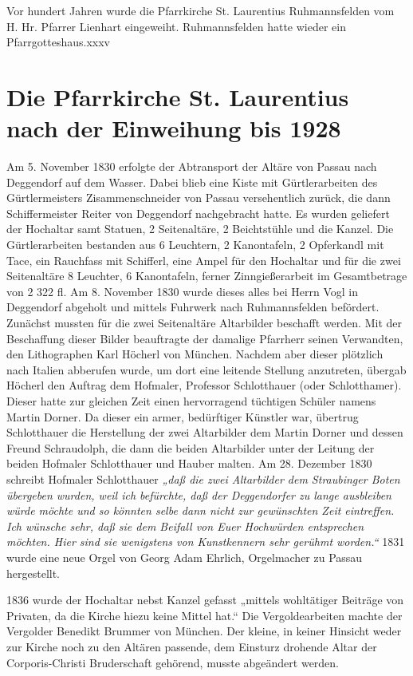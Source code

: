 \documentclass[12pt,a4paper]{book}
\begin{document}
Vor hundert Jahren wurde die Pfarrkirche St. Laurentius Ruhmannsfelden vom H.
Hr. Pfarrer Lienhart eingeweiht. Ruhmannsfelden hatte wieder ein
Pfarrgotteshaus.xxxv

\chapter{Die Pfarrkirche St. Laurentius nach der Einweihung bis 1928}

Am 5. November 1830 erfolgte der Abtransport der Altäre von Passau nach
Deggendorf auf dem Wasser. Dabei blieb eine Kiste mit Gürtlerarbeiten des
Gürtlermeisters Zisammenschneider von Passau versehentlich zurück, die dann
Schiffermeister Reiter von Deggendorf nachgebracht hatte. Es wurden geliefert
der Hochaltar samt Statuen, 2 Seitenaltäre, 2 Beichtstühle und die Kanzel. Die
Gürtlerarbeiten bestanden aus 6 Leuchtern, 2 Kanontafeln, 2 Opferkandl mit Tace,
ein Rauchfass mit Schifferl, eine Ampel für den Hochaltar und für die zwei
Seitenaltäre 8 Leuchter, 6 Kanontafeln, ferner Zinngießerarbeit im Gesamtbetrage
von 2 322 fl. Am 8. November 1830 wurde dieses alles bei Herrn Vogl in
Deggendorf abgeholt und mittels Fuhrwerk nach Ruhmannsfelden befördert. Zunächst
mussten für die zwei Seitenaltäre Altarbilder beschafft werden. Mit der
Beschaffung dieser Bilder beauftragte der damalige Pfarrherr seinen Verwandten,
den Lithographen Karl Höcherl von München. Nachdem aber dieser plötzlich nach
Italien abberufen wurde, um dort eine leitende Stellung anzutreten, übergab
Höcherl den Auftrag dem Hofmaler, Professor Schlotthauer (oder Schlotthamer).
Dieser hatte zur gleichen Zeit einen hervorragend tüchtigen Schüler namens
Martin Dorner. Da dieser ein armer, bedürftiger Künstler war, übertrug
Schlotthauer die Herstellung der zwei Altarbilder dem Martin Dorner und dessen
Freund Schraudolph, die dann die beiden Altarbilder unter der Leitung der beiden
Hofmaler Schlotthauer und Hauber malten. Am 28. Dezember 1830 schreibt Hofmaler
Schlotthauer \emph{„daß die zwei Altarbilder dem Straubinger Boten übergeben
wurden, weil ich befürchte, daß der Deggendorfer zu lange ausbleiben würde
möchte und so könnten selbe dann nicht zur gewünschten Zeit eintreffen. Ich
wünsche sehr, daß sie dem Beifall von Euer Hochwürden entsprechen möchten. Hier
sind sie wenigstens von Kunstkennern sehr gerühmt worden.“} 1831 wurde eine neue
Orgel von Georg Adam Ehrlich, Orgelmacher zu Passau hergestellt.

1836 wurde der Hochaltar nebst Kanzel gefasst „mittels wohltätiger Beiträge von
Privaten, da die Kirche hiezu keine Mittel hat.“ Die Vergoldearbeiten machte der
Vergolder Benedikt Brummer von München. Der kleine, in keiner Hinsicht weder zur
Kirche noch zu den Altären passende, dem Einsturz drohende Altar der
Corporis-Christi Bruderschaft gehörend, musste abgeändert werden.
\end{document}
